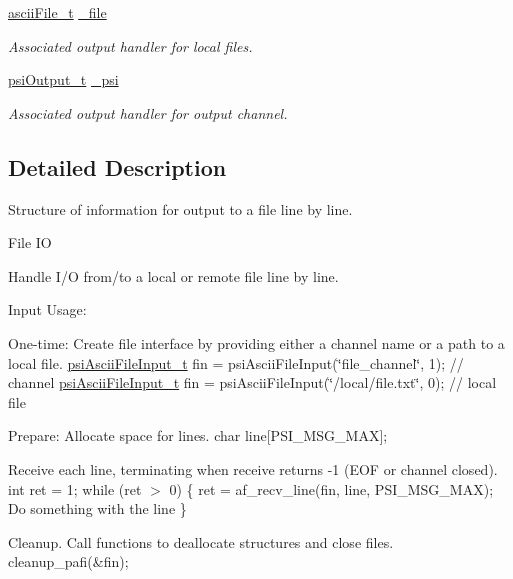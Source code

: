 \begin{DoxyCompactItemize}
\hyperlink{structasciiFile__t}{ascii\+File\+\_\+t} \hyperlink{structpsiAsciiFileOutput__t_aa3182952200aa71ebab66d18e2c7a32a}{\+\_\+file}
\begin{DoxyCompactList}\small\item\em Associated output handler for local files. \end{DoxyCompactList}\item 
\mbox{\label{structpsiAsciiFileOutput__t_a3253fef4940536b8fc4260bad6418cdd}} 
\hyperlink{structpsiOutput__t}{psi\+Output\+\_\+t} \hyperlink{structpsiAsciiFileOutput__t_a3253fef4940536b8fc4260bad6418cdd}{\+\_\+psi}
\begin{DoxyCompactList}\small\item\em Associated output handler for output channel. \end{DoxyCompactList}\end{DoxyCompactItemize}


\subsection{Detailed Description}
Structure of information for output to a file line by line. 

File IO

Handle I/O from/to a local or remote file line by line.

Input Usage\+:
\begin{DoxyEnumerate}
\item One-\/time\+: Create file interface by providing either a channel name or a path to a local file. \hyperlink{structpsiAsciiFileInput__t}{psi\+Ascii\+File\+Input\+\_\+t} fin = psi\+Ascii\+File\+Input(\char`\"{}file\+\_\+channel\char`\"{}, 1); // channel \hyperlink{structpsiAsciiFileInput__t}{psi\+Ascii\+File\+Input\+\_\+t} fin = psi\+Ascii\+File\+Input(\char`\"{}/local/file.\+txt\char`\"{}, 0); // local file
\item Prepare\+: Allocate space for lines. char line\mbox{[}P\+S\+I\+\_\+\+M\+S\+G\+\_\+\+M\+AX\mbox{]};
\item Receive each line, terminating when receive returns -\/1 (E\+OF or channel closed). int ret = 1; while (ret $>$ 0) \{ ret = af\+\_\+recv\+\_\+line(fin, line, P\+S\+I\+\_\+\+M\+S\+G\+\_\+\+M\+A\+X); Do something with the line \}
\item Cleanup. Call functions to deallocate structures and close files. cleanup\+\_\+pafi(\&fin);
\end{DoxyEnumerate}

